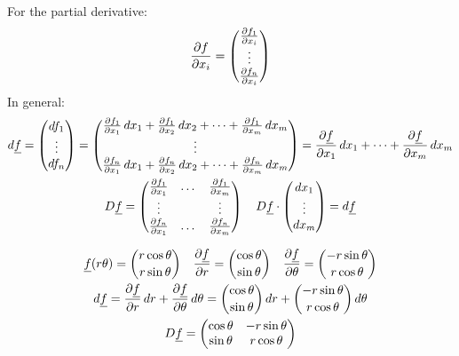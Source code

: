 \documentclass[00_complete]{subfiles}
\begin{document}
\begin{definition}[Derivative]
    For the partial derivative:
    \begin{gather*}
        \pdv{f}{x_i} = \begin{pmatrix}
            \pdv{f_1}{x_i} \\ \vdots \\ \pdv{f_n}{x_i}
        \end{pmatrix}
    \end{gather*}
    In general:
    \begin{gather*}
        \dd{\underline f}=\begin{pmatrix}
            \dd{f_1} \\ \vdots \\ \dd{f_n}
        \end{pmatrix} = \begin{pmatrix}
            \pdv{f_1}{x_1}\dd{x_1} +  \pdv{f_1}{x_2}\dd{x_2} +\dots+
            \pdv{f_1}{x_m}\dd{x_m} \\
            \vdots \\
            \pdv{f_n}{x_1}\dd{x_1} +  \pdv{f_n}{x_2}\dd{x_2} +\dots+
            \pdv{f_n}{x_m}\dd{x_m} \\
        \end{pmatrix} = \pdv{\underline f}{x_1}\dd{x_1}+\dots+\pdv{\underline
        f}{x_m}\dd{x_m} \\
    D\underline f = \begin{pmatrix}
    \pdv{f_1}{x_1}&\dots&\pdv{f_1}{x_m} \\
    \vdots && \vdots \\
    \pdv{f_n}{x_1}&\dots&\pdv{f_n}{x_m}
    \end{pmatrix} \quad
    D \underline f \cdot \begin{pmatrix}
    \dd{x_1} \\ \vdots \\ \dd{x_m}
    \end{pmatrix} = \dd{\underline f}
    \end{gather*}
\end{definition}
\begin{example}
    \begin{gather*}
        \underline f (r \theta)= \binom{r \cos \theta}{r \sin \theta} \quad
        \pdv{\underline f}{r} = \binom{\cos \theta}{\sin \theta} \quad
        \pdv{\underline f}{\theta}=\binom{-r\sin \theta}{r \cos \theta} \\
        \dd{\underline f} =\pdv{\underline f}{r}\dd{r}+\pdv{\underline
        f}{\theta}\dd{\theta} =
        \binom{\cos \theta}{\sin \theta}\dd{r}+
        \binom{-r\sin \theta}{r\cos \theta}\dd{\theta} \\
        D\underline f= \begin{pmatrix}
            \cos \theta & -r\sin \theta \\
            \sin \theta & r \cos \theta
        \end{pmatrix} \\
    \end{gather*}
\end{example}
\end{document}
